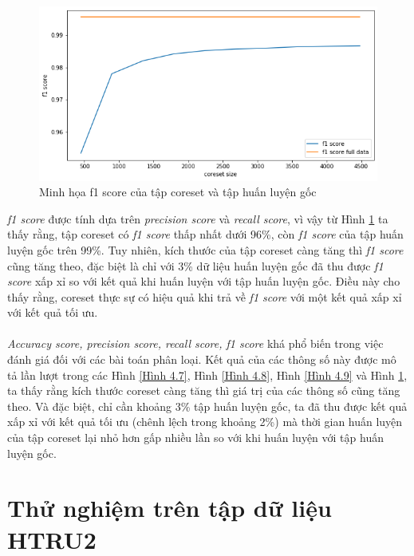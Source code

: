 \documentclass[a4paper, 12pt, oneside]{report}
\begin{document}
\begin{center}
    \begin{figure}[H]
    \begin{center}
     \includegraphics[scale=0.4]{f1_score_skin.png}
    \end{center}
    \caption{Minh họa f1 score của tập coreset và tập huấn luyện gốc}
    \label{Hình 4.10}
    \end{figure}
\end{center}
\textit{f1 score} được tính dựa trên \textit{precision score} và \textit{recall score}, vì vậy từ Hình \ref{Hình 4.10} ta thấy rằng, tập coreset có \textit{f1 score} thấp nhất dưới 96\%, còn \textit{f1 score} của tập huấn luyện gốc trên 99\%. Tuy nhiên, kích thước của tập coreset càng tăng thì \textit{f1 score} cũng tăng theo, đặc biệt là chỉ với 3\% dữ liệu huấn luyện gốc đã thu được \textit{f1 score} xấp xỉ so với kết quả khi huấn luyện với tập huấn luyện gốc. Điều này cho thấy rằng, coreset thực sự có hiệu quả khi trả về \textit{f1 score} với một kết quả xấp xỉ với kết quả tối ưu.\\ \\
\textit{Accuracy score, precision score, recall score, f1 score} khá phổ biến trong việc đánh giá đối với các bài toán phân loại. Kết quả của các thông số này được mô tả lần lượt trong các Hình \ref{Hình 4.7}, Hình \ref{Hình 4.8}, Hình \ref{Hình 4.9} và Hình \ref{Hình 4.10}, ta thấy rằng kích thước coreset càng tăng thì giá trị của các thông số cũng tăng theo. Và đặc biệt, chỉ cần khoảng 3\% tập huấn luyện gốc, ta đã thu được kết quả xấp xỉ với kết quả tối ưu (chênh lệch trong khoảng 2\%) mà thời gian huấn luyện của tập coreset lại nhỏ hơn gấp nhiều lần so với khi huấn luyện với tập huấn luyện gốc.

\section{Thử nghiệm trên tập dữ liệu HTRU2}
\end{document}
